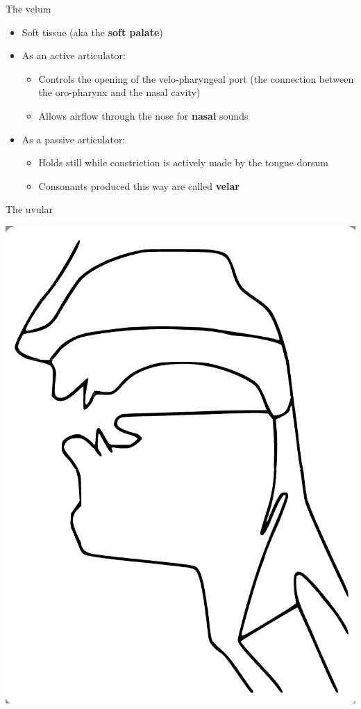 \documentclass[professionalfonts]{beamer}
\begin{document}
\begin{frame}{The velum}
    \begin{itemize}
        \item Soft tissue (aka the \textbf{soft palate})
        \item As an active articulator:
        \begin{itemize}
            \item Controls the opening of the velo-pharyngeal port (the connection between the oro-pharynx and the nasal cavity)
            \item Allows airflow through the nose for \textbf{nasal} sounds
        \end{itemize}
        \item As a passive articulator:
        \begin{itemize}
            \item Holds still while constriction is actively made by the tongue dorsum
            \item Consonants produced this way are called \textbf{velar}
        \end{itemize}
    \end{itemize}
\end{frame}

\begin{frame}{The uvular}
    \begin{center}
        \includegraphics[width = .5\textwidth]{figs/Uvular.png}
    \end{center}
\end{frame}
\end{document}
